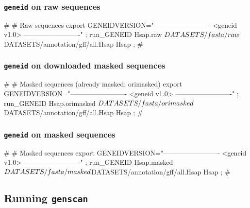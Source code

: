 \documentclass[11pt]{article}
\def\nwendcode{\endtrivlist \endgroup} %
\let\nwdocspar=\par                    %
\newcommand{\subsctn}[1]{\subsection{#1}}
\newcommand{\subsubsctn}[1]{\subsubsection{#1}}
\def\gnid{\texttt{geneid}}
\def\gnsc{\texttt{genscan}}
\begin{document}
\subsubsctn{{\gnid} on raw sequences} 

\nwenddocs{}\plusendmoddef
#
# Raw sequences
export GENEIDVERSION="------------------------- <geneid v1.0> -------------------------" ;
run_GENEID Hsap.raw $DATASETS/fasta/raw \\
                    $DATASETS/annotation/gff/all.Hsap Hsap ;
#
\nwendcode{}\nwdocspar

\subsubsctn{{\gnid} on downloaded masked sequences} 

\nwenddocs{}\plusendmoddef
#
# Masked sequences (already masked: orimasked)
export GENEIDVERSION="------------------------- <geneid v1.0> -------------------------" ;
run_GENEID Hsap.orimasked $DATASETS/fasta/orimasked \\
                          $DATASETS/annotation/gff/all.Hsap Hsap ;
#
\nwendcode{}\nwdocspar
 
\subsubsctn{{\gnid} on masked sequences} 

\nwenddocs{}\plusendmoddef
#
# Masked sequences
export GENEIDVERSION="------------------------- <geneid v1.0> -------------------------" ;
run_GENEID Hsap.masked $DATASETS/fasta/masked \\
                       $DATASETS/annotation/gff/all.Hsap Hsap ;
#
\nwendcode{}\nwdocspar

\subsctn{Running {\gnsc}}
 
\end{document}
